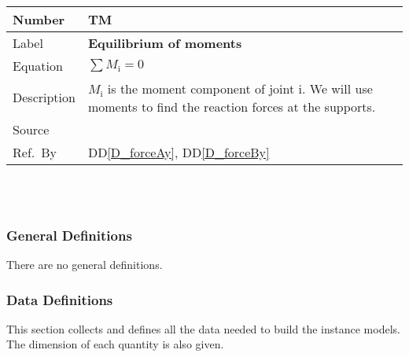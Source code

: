\documentclass[12pt]{article}
\newcommand{\colAwidth}{0.13\textwidth}
\newcommand{\colBwidth}{0.82\textwidth}
\newcommand{\ddref}[1]{DD\ref{#1}}
\newcounter{theorynum} %
\begin{document}
~\newline

\noindent
\begin{minipage}{\textwidth}
	\renewcommand*{\arraystretch}{1.5}
	\begin{tabular}{| p{\colAwidth} | p{\colBwidth}|}
		\hline
		\rowcolor[gray]{0.9}
		Number& TM{theorynum}\thetheorynum \label{T_mom}\\
		\hline
		Label&\bf Equilibrium of moments\\
		\hline
		Equation&$ \sum M_{\text{i}} = 0 $ \\
		\hline
		Description &$M_{\text{i}}$ is the moment component of joint i. We will 
		use 
		moments to find the reaction forces at the supports.\\
		\hline
		Source &
		\cite{Moment}\\
		\hline
		Ref.\ By & \ddref{D_forceAy}, \ddref{D_forceBy}\\
		\hline
	\end{tabular}
\end{minipage}\\

~\newline

\subsubsection{General Definitions}\label{sec_gendef}
There are no general definitions.

\subsubsection{Data Definitions}\label{sec_datadef}

This section collects and defines all the data needed to build the instance
models. The dimension of each quantity is also given.  

~\newline
\end{document}
